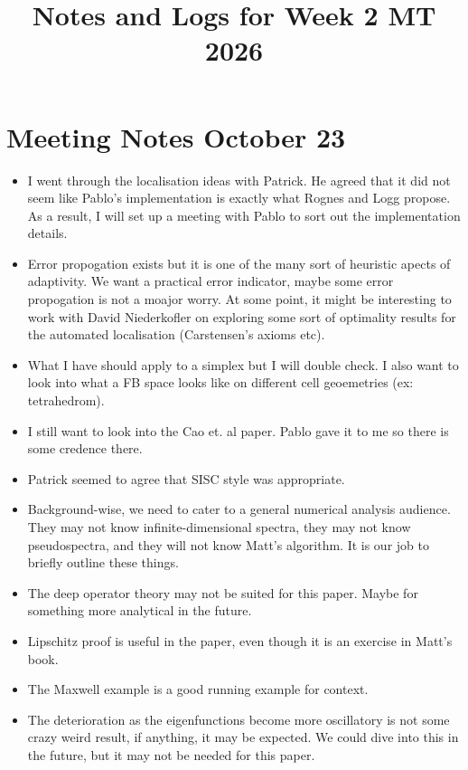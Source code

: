 \documentclass[12pt,a4paper]{article}
\title{\textbf{Notes and Logs for Week 2 MT 2026}}
\author{}
\date{}
\begin{document}
\maketitle

\section{Meeting Notes October 23}

\begin{itemize}
    \item I went through the localisation ideas with Patrick. He agreed that it did not seem like Pablo's implementation is exactly what Rognes and Logg propose. As a result, I will set up a meeting with Pablo to sort out the implementation details.
    \item Error propogation exists but it is one of the many sort of heuristic apects of adaptivity. We want a practical error indicator, maybe some error propogation is not a moajor worry. At some point, it might be interesting to work with David Niederkofler on exploring some sort of optimality results for the automated localisation (Carstensen's axioms etc). 
    \item What I have should apply to a simplex but I will double check. I also want to look into what a FB space looks like on different cell geoemetries (ex: tetrahedrom). 
    \item I still want to look into the Cao et. al paper. Pablo gave it to me so there is some credence there. 
    \item Patrick seemed to agree that SISC style was appropriate. 
    \item Background-wise, we need to cater to a general numerical analysis audience. They may not know infinite-dimensional spectra, they may not know pseudospectra, and they will not know Matt's algorithm. It is our job to briefly outline these things. 
    \item The deep operator theory may not be suited for this paper. Maybe for something more analytical in the future. 
    \item Lipschitz proof is useful in the paper, even though it is an exercise in Matt's book. 
    \item The Maxwell example is a good running example for context. 
    \item The deterioration as the eigenfunctions become more oscillatory is not some crazy weird result, if anything, it may be expected. We could dive into this in the future, but it may not be needed for this paper. 

\end{itemize}
\end{document}
